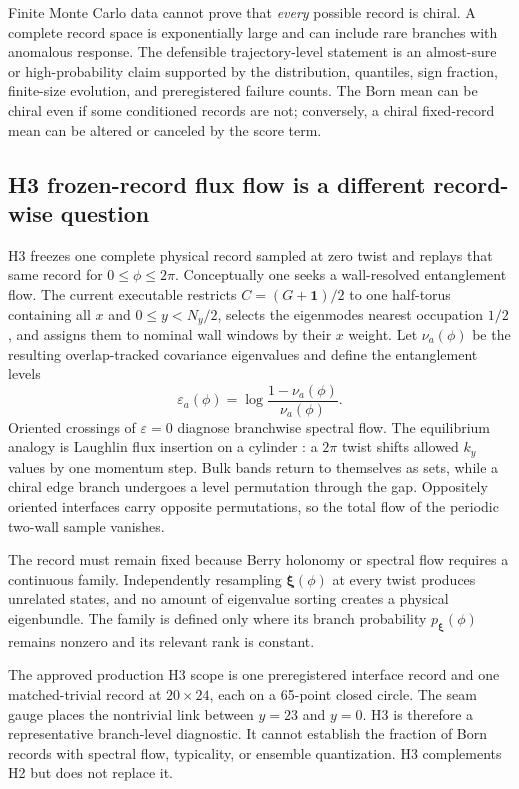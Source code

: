 \documentclass[aps,prb,onecolumn,nofootinbib,superscriptaddress]{revtex4-2}
\newcommand{\Id}{\mathbf{1}}
\newcommand{\bxi}{\bm{\xi}}
\begin{document}
Finite Monte Carlo data cannot prove that \emph{every} possible record is
chiral.  A complete record space is exponentially large and can include rare
branches with anomalous response.  The defensible trajectory-level statement
is an almost-sure or high-probability claim supported by the distribution,
quantiles, sign fraction, finite-size evolution, and preregistered failure
counts.  The Born mean can be chiral even if some conditioned records are not;
conversely, a chiral fixed-record mean can be altered or canceled by the score
term.

\subsection{H3 frozen-record flux flow is a different record-wise question}

H3 freezes one complete physical record sampled at zero twist and replays that
same record for $0\le\phi\le2\pi$.  Conceptually one seeks a wall-resolved
entanglement flow.  The current executable restricts $C=(G+\Id)/2$ to one
half-torus containing all $x$ and $0\le y<N_y/2$, selects the eigenmodes nearest
occupation $1/2$, and assigns them to nominal wall windows by their $x$ weight.
Let $\nu_a(\phi)$ be the resulting overlap-tracked covariance eigenvalues and
define the entanglement levels
\begin{equation}
  \varepsilon_a(\phi)=\log\frac{1-\nu_a(\phi)}{\nu_a(\phi)}.
  \label{eq:entanglement-level}
\end{equation}
Oriented crossings of $\varepsilon=0$ diagnose branchwise spectral flow.  The
equilibrium analogy is Laughlin flux insertion on a cylinder
\cite{Laughlin1981}: a $2\pi$ twist shifts allowed $k_y$ values by one momentum
step.  Bulk bands return to themselves as sets, while a chiral edge branch
undergoes a level permutation through the gap.  Oppositely oriented interfaces
carry opposite permutations, so the total flow of the periodic two-wall
sample vanishes.

The record must remain fixed because Berry holonomy or spectral flow requires
a continuous family.  Independently resampling $\bxi(\phi)$ at every twist
produces unrelated states, and no amount of eigenvalue sorting creates a
physical eigenbundle.  The family is defined only where its branch probability
$p_{\bxi}(\phi)$ remains nonzero and its relevant rank is constant.

The approved production H3 scope is one preregistered interface record and one
matched-trivial record at $20\times24$, each on a 65-point closed circle.  The
seam gauge places the nontrivial link between $y=23$ and $y=0$.  H3 is therefore
a representative branch-level diagnostic.  It cannot establish
the fraction of Born records with spectral flow, typicality, or ensemble
quantization.  H3 complements H2 but does not replace it.
\end{document}

